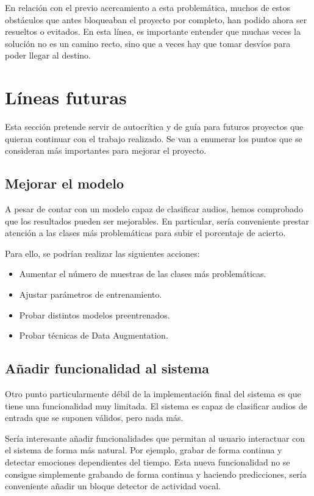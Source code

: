 En relación con el previo acercamiento a esta problemática, muchos de estos obstáculos que antes bloqueaban el proyecto por completo, han podido ahora ser resueltos o evitados.
En esta línea, es importante entender que muchas veces la solución no es un camino recto, sino que a veces hay que tomar desvíos para poder llegar al destino.


\section{Líneas futuras}

Esta sección pretende servir de autocrítica y de guía para futuros proyectos que quieran continuar con el trabajo realizado.
Se van a enumerar los puntos que se consideran más importantes para mejorar el proyecto.


\subsection{Mejorar el modelo}
A pesar de contar con un modelo capaz de clasificar audios, hemos comprobado que los resultados pueden ser mejorables.
En particular, sería conveniente prestar atención a las clases más problemáticas para subir el porcentaje de acierto.

Para ello, se podrían realizar las siguientes acciones:
\begin{itemize}
    \item Aumentar el número de muestras de las clases más problemáticas.
    \item Ajustar parámetros de entrenamiento.
    \item Probar distintos modelos preentrenados.
    \item Probar técnicas de Data Augmentation.
\end{itemize}




\subsection{Añadir funcionalidad al sistema}
Otro punto particularmente débil de la implementación final del sistema es que tiene una funcionalidad muy limitada.
El sistema es capaz de clasificar audios de entrada que se suponen válidos, pero nada más.

Sería interesante añadir funcionalidades que permitan al usuario interactuar con el sistema de forma más natural.
Por ejemplo, grabar de forma continua y detectar emociones dependientes del tiempo.
Esta nueva funcionalidad no se consigue simplemente grabando de forma continua y haciendo predicciones, sería conveniente añadir un bloque detector de actividad vocal.

